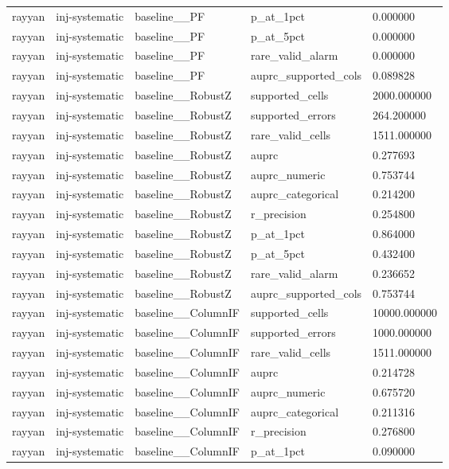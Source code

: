 \begin{tabular}{lllll}
rayyan & inj-systematic & baseline\_\_PF & p\_at\_1pct & 0.000000 \\
rayyan & inj-systematic & baseline\_\_PF & p\_at\_5pct & 0.000000 \\
rayyan & inj-systematic & baseline\_\_PF & rare\_valid\_alarm & 0.000000 \\
rayyan & inj-systematic & baseline\_\_PF & auprc\_supported\_cols & 0.089828 \\
rayyan & inj-systematic & baseline\_\_RobustZ & supported\_cells & 2000.000000 \\
rayyan & inj-systematic & baseline\_\_RobustZ & supported\_errors & 264.200000 \\
rayyan & inj-systematic & baseline\_\_RobustZ & rare\_valid\_cells & 1511.000000 \\
rayyan & inj-systematic & baseline\_\_RobustZ & auprc & 0.277693 \\
rayyan & inj-systematic & baseline\_\_RobustZ & auprc\_numeric & 0.753744 \\
rayyan & inj-systematic & baseline\_\_RobustZ & auprc\_categorical & 0.214200 \\
rayyan & inj-systematic & baseline\_\_RobustZ & r\_precision & 0.254800 \\
rayyan & inj-systematic & baseline\_\_RobustZ & p\_at\_1pct & 0.864000 \\
rayyan & inj-systematic & baseline\_\_RobustZ & p\_at\_5pct & 0.432400 \\
rayyan & inj-systematic & baseline\_\_RobustZ & rare\_valid\_alarm & 0.236652 \\
rayyan & inj-systematic & baseline\_\_RobustZ & auprc\_supported\_cols & 0.753744 \\
rayyan & inj-systematic & baseline\_\_ColumnIF & supported\_cells & 10000.000000 \\
rayyan & inj-systematic & baseline\_\_ColumnIF & supported\_errors & 1000.000000 \\
rayyan & inj-systematic & baseline\_\_ColumnIF & rare\_valid\_cells & 1511.000000 \\
rayyan & inj-systematic & baseline\_\_ColumnIF & auprc & 0.214728 \\
rayyan & inj-systematic & baseline\_\_ColumnIF & auprc\_numeric & 0.675720 \\
rayyan & inj-systematic & baseline\_\_ColumnIF & auprc\_categorical & 0.211316 \\
rayyan & inj-systematic & baseline\_\_ColumnIF & r\_precision & 0.276800 \\
rayyan & inj-systematic & baseline\_\_ColumnIF & p\_at\_1pct & 0.090000 \\

\end{tabular}
